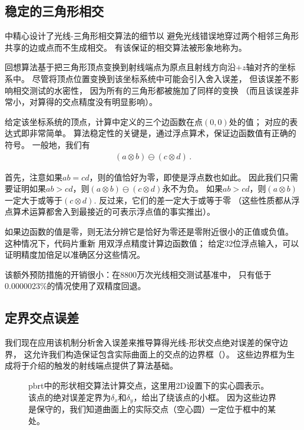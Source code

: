 \subsection{稳定的三角形相交}\label{sub:稳定的三角形相交}
中精心设计了光线-三角形相交算法的细节以
避免光线错误地穿过两个相邻三角形共享的边或点而不生成相交。
有该保证的相交算法被形象地称为。

回想算法基于把三角形顶点变换到射线端点为原点且射线方向沿$+z$轴对齐的坐标系中。
尽管将顶点位置变换到该坐标系统中可能会引入舍入误差，
但该误差不影响相交测试的水密性，
因为所有的三角形都被施加了同样的变换
（而且该误差非常小，对算得的交点精度没有明显影响）。

给定该坐标系统的顶点，计算中定义的三个边函数在点$(0,0)$处的值；
对应的表达式即非常简单。
算法稳定性的关键是，通过浮点算术，保证边函数值有正确的符号。
一般地，我们有
\begin{align}\label{eq:3.12}
    (a\otimes b)\ominus(c\otimes d)\, .
\end{align}

首先，注意如果$ab=cd$，则的值恰好为零，即使是浮点数也如此。
因此我们只需要证明如果$ab>cd$，则$(a\otimes b)\ominus(c\otimes d)$永不为负。
如果$ab>cd$，则$(a\otimes b)$一定大于或等于$(c\otimes d)$.
反过来，它们的差一定大于或等于零
（这些性质都从浮点算术运算都舍入到最接近的可表示浮点值的事实推出）。

如果边函数的值是零，则无法分辨它是恰好为零还是零附近很小的正值或负值。
这种情况下，代码片重新
用双浮点精度计算边函数值；
给定32位浮点输入，可以证明精度加倍足以准确区分这些情况。

该额外预防措施的开销很小：在8800万次光线相交测试基准中，
只有低于0.0000023\%的情况使用了双精度回退。

\subsection{定界交点误差}\label{sub:定界交点误差}
我们现在应用该机制分析舍入误差来推导算得光线-形状交点绝对误差的保守边界，
这允许我们构造保证包含实际曲面上的交点的边界框（）。
这些边界框为生成将于介绍的触发的射线端点提供了算法基础。
\begin{figure}[htbp]
    \centering
    \caption{pbrt中的形状相交算法计算交点，这里用2D设置下的实心圆表示。
        该点的绝对误差定界为$\delta_x$和$\delta_y$，给出了绕该点的小框。
        因为这些边界是保守的，我们知道曲面上的实际交点（空心圆）一定位于框中的某处。}
    \label{fig:3.43}
\end{figure}

